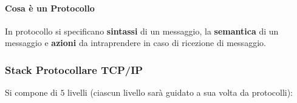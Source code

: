 \documentclass{article}
\begin{document}
\paragraph{Cosa è un Protocollo} In protocollo si specificano \textbf{sintassi} di un messaggio, la \textbf{semantica} di un messaggio e \textbf{azioni} da intraprendere in caso di ricezione di messaggio. 

\vspace*{10px}

\subsubsection{Stack Protocollare TCP/IP}

Si compone di $5$ livelli (ciascun livello sarà guidato a sua volta da protocolli):

\vspace*{10px}
\end{document}
